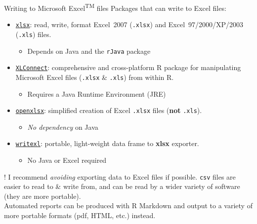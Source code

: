 \documentclass[
  11pt,
  ignorenonframetext,
]{beamer}
\providecommand{\tightlist}{%
  \setlength{\itemsep}{0pt}\setlength{\parskip}{0pt}}
\begin{document}
\begin{frame}{Writing to Microsoft
Excel\textsuperscript{TM} files}
\protect\hypertarget{writing-to-microsoft-exceltm-files}{}
Packages that can write to Excel files:

\begin{itemize}
\tightlist
\item
  \href{https://github.com/colearendt/xlsx}{\texttt{xlsx}}: read, write,
  format Excel~2007 (\texttt{.xlsx}) and Excel~97/2000/XP/2003
  (\texttt{.xls}) files.

  \begin{itemize}
  \tightlist
  \item
    Depends on Java and the \texttt{rJava} package
  \end{itemize}
\item
  \href{https://github.com/miraisolutions/xlconnect}{\texttt{XLConnect}}:
  comprehensive and cross-platform R package for manipulating Microsoft
  Excel files (\texttt{.xlsx} \& \texttt{.xls}) from within R.

  \begin{itemize}
  \tightlist
  \item
    Requires a Java Runtime Environment (JRE)
  \end{itemize}
\item
  \href{https://ycphs.github.io/openxlsx/index.html}{\texttt{openxlsx}}:
  simplified creation of Excel \texttt{.xlsx} files (\textbf{not}
  \texttt{.xls}).

  \begin{itemize}
  \tightlist
  \item
    \emph{No dependency} on Java
  \end{itemize}
\item
  \href{https://docs.ropensci.org/writexl/}{\texttt{writexl}}: portable,
  light-weight data frame to \textbf{xlsx} exporter.

  \begin{itemize}
  \tightlist
  \item
    No Java or Excel required
  \end{itemize}
\end{itemize}

\begin{block}{!}
\protect\hypertarget{section-1}{}
I recommend \emph{avoiding} exporting data to Excel files if possible.
\texttt{csv} files are easier to read to \& write from, and can be read
by a wider variety of software (they are more portable).\\
Automated reports can be produced with R Markdown and output to a
variety of more portable formats (pdf, HTML, etc.) instead.


\end{block}
\end{frame}
\end{document}
